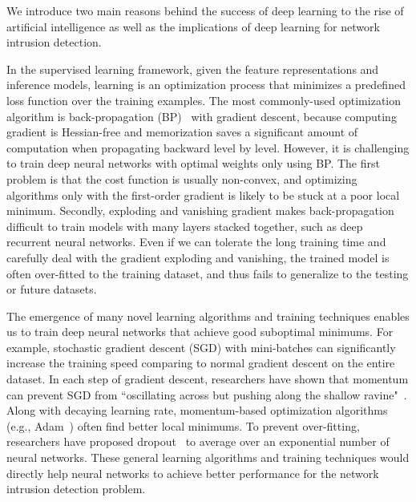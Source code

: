 
We introduce two main reasons behind the success of deep learning to the rise of artificial intelligence
as well as the implications of deep learning for network intrusion detection.

In the supervised learning framework, given the feature representations and inference models,
learning is an optimization process that minimizes a predefined loss function over the training examples.
The most commonly-used optimization algorithm is back-propagation (BP)~\cite{Backpropagation} with gradient descent,
because computing gradient is Hessian-free and memorization saves a significant amount of computation when propagating backward level by level.
However, it is challenging to train deep neural networks with optimal weights only using BP.
The first problem is that the cost function is usually non-convex, and
optimizing algorithms only with the first-order gradient is likely to be stuck at a poor local minimum.
Secondly, exploding and vanishing gradient makes back-propagation difficult to train models with many layers stacked together,
such as deep recurrent neural networks.
Even if we can tolerate the long training time and carefully deal with the gradient exploding and vanishing,
the trained model is often over-fitted to the training dataset, and thus fails to generalize to the testing or future datasets.

The emergence of many novel learning algorithms and training techniques enables us to train deep neural networks that achieve good suboptimal minimums.
For example, stochastic gradient descent (SGD) with mini-batches can significantly increase the training speed comparing
to normal gradient descent on the entire dataset.
In each step of gradient descent, researchers have shown that momentum can
prevent SGD from ``oscillating across but pushing along the shallow ravine"~\cite{Momentum}.
Along with decaying learning rate, momentum-based optimization algorithms (e.g., Adam~\cite{Adam}) often find better local minimums.
To prevent over-fitting, researchers have proposed dropout~\cite{Dropout} to average over an exponential number of neural networks.
These general learning algorithms and training techniques would directly help neural networks to achieve better performance for the network intrusion detection problem.

